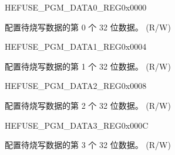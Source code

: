 \begin{register}{H}{EFUSE\_PGM\_DATA0\_REG}{0x0000}\label{regdesc:EFUSEPGMDATA0REG}
%
\regnewline%
\begin{regdesc}\begin{reglist}
\label{fielddesc:EFUSEPGMDATA0}\item [EFUSE\_PGM\_DATA\_0] 配置待烧写数据的第 0 个 32 位数据。 (R/W)
\end{reglist}\end{regdesc}
\end{register}


\begin{register}{H}{EFUSE\_PGM\_DATA1\_REG}{0x0004}\label{regdesc:EFUSEPGMDATA1REG}
%
\regnewline%
\begin{regdesc}\begin{reglist}
\label{fielddesc:EFUSEPGMDATA1}\item [EFUSE\_PGM\_DATA\_1] 配置待烧写数据的第 1 个 32 位数据。 (R/W)
\end{reglist}\end{regdesc}
\end{register}


\begin{register}{H}{EFUSE\_PGM\_DATA2\_REG}{0x0008}\label{regdesc:EFUSEPGMDATA2REG}
%
\regnewline%
\begin{regdesc}\begin{reglist}
\label{fielddesc:EFUSEPGMDATA2}\item [EFUSE\_PGM\_DATA\_2] 配置待烧写数据的第 2 个 32 位数据。 (R/W)
\end{reglist}\end{regdesc}
\end{register}


\begin{register}{H}{EFUSE\_PGM\_DATA3\_REG}{0x000C}\label{regdesc:EFUSEPGMDATA3REG}
%
\regnewline%
\begin{regdesc}\begin{reglist}
\label{fielddesc:EFUSEPGMDATA3}\item [EFUSE\_PGM\_DATA\_3] 配置待烧写数据的第 3 个 32 位数据。 (R/W)
\end{reglist}\end{regdesc}
\end{register}


